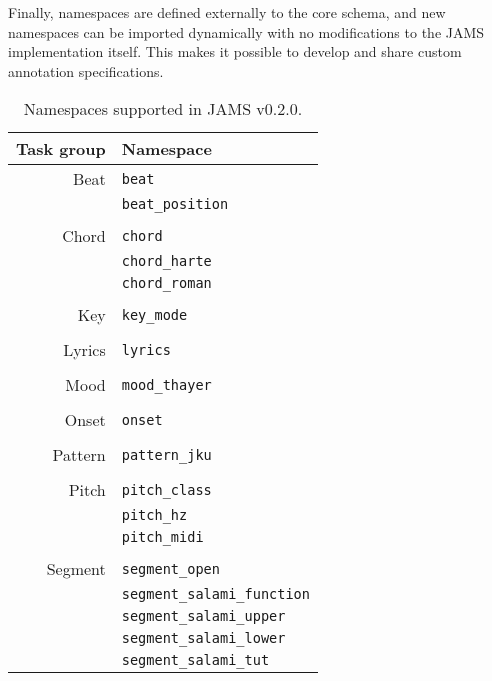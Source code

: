 \documentclass{article}
\begin{document}
Finally, namespaces are defined externally to the core schema, and new namespaces can be imported dynamically with no modifications to the JAMS implementation itself.
This makes it possible to develop and share custom annotation specifications.

\begin{table}
    \caption{Namespaces supported in JAMS v0.2.0.}\label{tab:namespaces}
    \centering
    \begin{tabular}{rl}
    \toprule
    Task group                  & Namespace\\
    \midrule
    Beat       & \texttt{beat}\\
                                & \texttt{beat\_position}\\
\\
    Chord      & \texttt{chord}\\
                                & \texttt{chord\_harte}\\
                                & \texttt{chord\_roman}\\
\\
    Key                         & \texttt{key\_mode }\\
\\
    Lyrics                      & \texttt{lyrics}\\
\\
    Mood                        & \texttt{mood\_thayer}\\
\\
    Onset                       & \texttt{onset}\\
\\
    Pattern                     & \texttt{pattern\_jku}\\
\\
    Pitch      & \texttt{pitch\_class}\\
                                & \texttt{pitch\_hz}\\
                                & \texttt{pitch\_midi}\\
\\
    Segment    & \texttt{segment\_open}\\
                                & \texttt{segment\_salami\_function}\\
                                & \texttt{segment\_salami\_upper}\\
                                & \texttt{segment\_salami\_lower}\\
                                & \texttt{segment\_salami\_tut}\\

\end{tabular}
\end{table}
\end{document}
